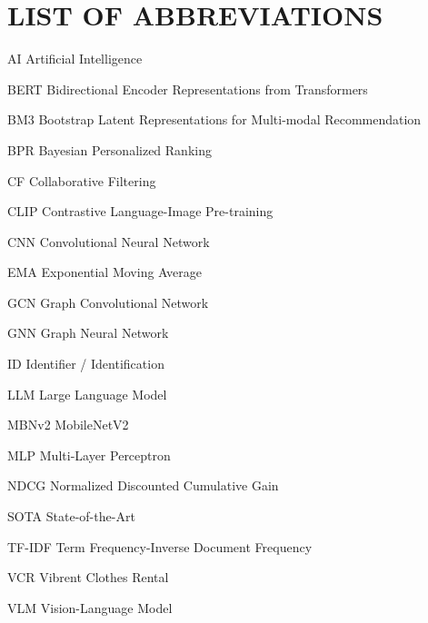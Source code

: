 \titleformat{\chapter}{\fontsize{16}{20}\selectfont\bfseries\centering}{\thechapter}{1ex}{\vspace*{-2.5cm}}
\chapter*{LIST OF ABBREVIATIONS}
\begin{abbrv}
	\item[AI] Artificial Intelligence
	\item[BERT] Bidirectional Encoder Representations from Transformers
	\item[BM3] Bootstrap Latent Representations for Multi-modal Recommendation
	\item[BPR] Bayesian Personalized Ranking
	\item[CF] Collaborative Filtering
	\item[CLIP] Contrastive Language-Image Pre-training
	\item[CNN] Convolutional Neural Network
	\item[EMA] Exponential Moving Average
	\item[GCN] Graph Convolutional Network
	\item[GNN] Graph Neural Network
	\item[ID] Identifier / Identification
	\item[LLM] Large Language Model
	\item[MBNv2] MobileNetV2
	\item[MLP] Multi-Layer Perceptron
	\item[NDCG] Normalized Discounted Cumulative Gain
	\item[SOTA] State-of-the-Art
	\item[TF-IDF] Term Frequency-Inverse Document Frequency
	\item[VCR] Vibrent Clothes Rental
	\item[VLM] Vision-Language Model
\end{abbrv}


\newpage
{}
\titleformat{\chapter}[hang]{\bfseries\fontsize{16}{19}\selectfont\raggedright}{\MakeUppercase{\chaptername}\ \thechapter}{1ex}{\MakeUppercase}
\titlespacing*{\chapter}{0pt}{20pt}{20pt}
\pagestyle{fancy}